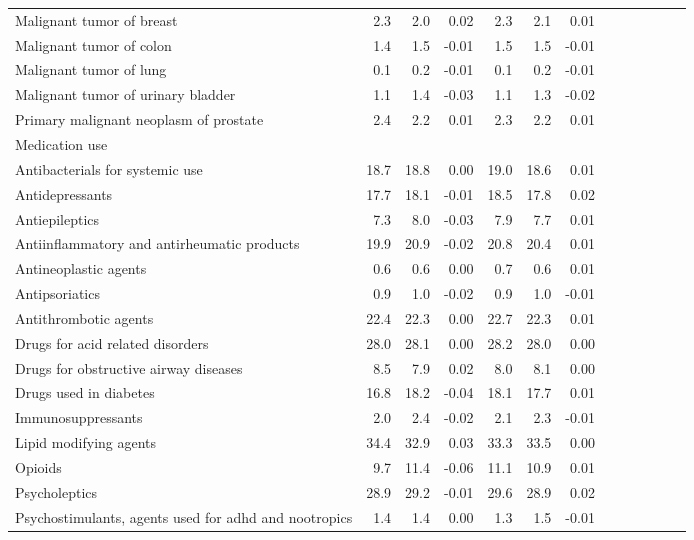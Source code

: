 \documentclass[11pt,]{article}
\begin{document}
\begin{longtable}{lrrrrrrrrrrrr}
      Malignant tumor of breast &  2.3 &  2.0 &  0.02 &  2.3 &  2.1 &  0.01 \\ 
      Malignant tumor of colon &  1.4 &  1.5 & -0.01 &  1.5 &  1.5 & -0.01 \\ 
      Malignant tumor of lung &  0.1 &  0.2 & -0.01 &  0.1 &  0.2 & -0.01 \\ 
      Malignant tumor of urinary bladder &  1.1 &  1.4 & -0.03 &  1.1 &  1.3 & -0.02 \\ 
      Primary malignant neoplasm of prostate &  2.4 &  2.2 &  0.01 &  2.3 &  2.2 &  0.01 \\ 
  Medication use &    &    &     &    &    &     \\ 
      Antibacterials for systemic use & 18.7 & 18.8 &  0.00 & 19.0 & 18.6 &  0.01 \\ 
      Antidepressants & 17.7 & 18.1 & -0.01 & 18.5 & 17.8 &  0.02 \\ 
      Antiepileptics &  7.3 &  8.0 & -0.03 &  7.9 &  7.7 &  0.01 \\ 
      Antiinflammatory and antirheumatic products & 19.9 & 20.9 & -0.02 & 20.8 & 20.4 &  0.01 \\ 
      Antineoplastic agents &  0.6 &  0.6 &  0.00 &  0.7 &  0.6 &  0.01 \\ 
      Antipsoriatics &  0.9 &  1.0 & -0.02 &  0.9 &  1.0 & -0.01 \\ 
      Antithrombotic agents & 22.4 & 22.3 &  0.00 & 22.7 & 22.3 &  0.01 \\ 
      Drugs for acid related disorders & 28.0 & 28.1 &  0.00 & 28.2 & 28.0 &  0.00 \\ 
      Drugs for obstructive airway diseases &  8.5 &  7.9 &  0.02 &  8.0 &  8.1 &  0.00 \\ 
      Drugs used in diabetes & 16.8 & 18.2 & -0.04 & 18.1 & 17.7 &  0.01 \\ 
      Immunosuppressants &  2.0 &  2.4 & -0.02 &  2.1 &  2.3 & -0.01 \\ 
      Lipid modifying agents & 34.4 & 32.9 &  0.03 & 33.3 & 33.5 &  0.00 \\ 
      Opioids &  9.7 & 11.4 & -0.06 & 11.1 & 10.9 &  0.01 \\ 
      Psycholeptics & 28.9 & 29.2 & -0.01 & 29.6 & 28.9 &  0.02 \\ 
      Psychostimulants, agents used for adhd and nootropics &  1.4 &  1.4 &  0.00 &  1.3 &  1.5 & -0.01 \\ 
   \bottomrule\end{longtable}
\clearpage
{}
\end{document}
